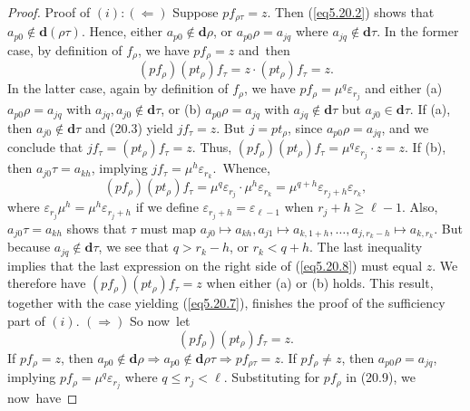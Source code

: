 \documentclass{surv-l}
\numberwithin{equation}{section}
\numberwithin{table}{section}
\numberwithin{figure}{section}
\theoremstyle{definition}
\begin{document}
\begin{proof} Proof of $(i): (\Leftarrow)$ Suppose $pf_{\rho\tau}=z$.
Then (\ref{eq5.20.2}) shows that $a_{p0}\not\in
\mathbf{d}(\rho\tau)$. Hence, either $a_{p0}\not\in
\mathbf{d}\rho$, or $a_{p0}\rho=a_{jq}$ where $ a_{jq}\not\in
\mathbf{d}\tau$. In the former case, by definition of $f_{\rho}$,
we have $pf_{\rho}=z$ and~then
\begin{equation}\label{eq5.20.7}
(pf_{\rho})(pt_{\rho})f_{\tau}=z\cdot(pt_{\rho})f_{\tau}=z.
\end{equation}
In the latter case, again by definition of $f_{\rho}$, we have
$pf_{\rho}=\mu^{q}\varepsilon_{r_{j}}$ and either (a)
$a_{p0}\rho=a_{jq}$ with $a_{jq},  a_{j0}\not\in \mathbf{d}\tau$,
or (b) $a_{p0}\rho=a_{jq}$ with $ a_{jq}\not\in \mathbf{d}\tau$
but $a_{j0}\in \textbf{d}\tau$. If (a), then $ a_{j0}\not\in \mathbf{d}\tau$
and (20.3) yield $jf_{\tau}=z$. But $j=pt_{\rho}$, since
$a_{p0}\rho=a_{jq}$, and we conclude that
$jf_{\tau}=(pt_{\rho})f_{\tau}=z$. Thus,
$(pf_{\rho})(pt_{\rho})f_{\tau}= \mu^{q}\varepsilon_{r_{j}}\cdot
z=z$. If (b), then $a_{j0}\tau=a_{kh}$, implying
$jf_{\tau}=\mu^{h}\varepsilon_{r_{k}}$.~Whence,
\begin{equation}\label{eq5.20.8}
 (pf_{\rho})(pt_{\rho})f_{\tau}=\mu^{q}\varepsilon_{r_{j}}\cdot\mu^{h}\varepsilon_{r_{k}}
 =\mu^{q+h}\varepsilon_{r_{j}+h}\varepsilon_{r_{k}},
\end{equation}
where $\varepsilon_{r_{j}}\mu^{h}=\mu^{h}\varepsilon_{r_{j}+h}$ if
we define $\varepsilon_{r_{j}+h}=\varepsilon_{\ell-1}$ when
$r_{j}+h\geq\ell-1$. Also, $a_{j0}\tau=a_{kh}$ shows that $\tau$
must map $a_{j0}\mapsto a_{kh}, a_{j1}\mapsto a_{k,1+h},\ldots,
a_{j,r_{k}-h}\mapsto a_{k,r_{k}}$. But because $ a_{jq}\not\in
\mathbf{d}\tau$, we see that $q>r_{k}-h$, or $r_{k}<q+h$. The last
inequality implies that the last expression on the right side of
(\ref{eq5.20.8}) must equal $z$. We therefore have
$(pf_{\rho})(pt_{\rho})f_{\tau}=z$ when either (a) or (b) holds.
This result, together with the case yielding (\ref{eq5.20.7}),
finishes the proof of the sufficiency part of $(i)$. $(\Rightarrow)$
So now~let
\begin{equation}\label{eq5.20.9}
 (pf_{\rho})(pt_{\rho})f_{\tau}=z.
\end{equation}
If $pf_{\rho}=z$, then $a_{p0}\not\in \mathbf{d}\rho\Rightarrow
a_{p0}\not\in \mathbf{d}\rho\tau\Rightarrow pf_{\rho\tau}=z$. If
$pf_{\rho}\neq z$, then $a_{p0}\rho=a_{jq}$, implying
$pf_{\rho}=\mu^{q}\varepsilon_{r_{j}}$ where $ q\leq r_{j}<\ell$.
Substituting for $pf_{\rho}$ in (20.9), we now~have

\end{proof}
\end{document}
